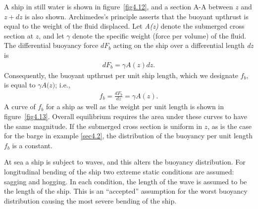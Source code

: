 \documentclass{AeroStructure-ERJohnson}
\begin{document}
A ship in still water is shown in figure~\ref{fig4.12}, and a section A-A between $z$ and $z + \textit{dz}$ is also shown. Archimedes's principle asserts that the buoyant upthrust is equal to the weight of the fluid displaced. Let \textit{A(z)} denote the submerged cross section at $z$, and let $\gamma$ denote the specific weight (force per volume) of the fluid. The differential buoyancy force $dF_{b}$ acting on the ship over a differential length \textit{dz} is
{\def\thefigure{4.12}
}
\vspace*{-2\baselineskip}
\begin{align}\label{eq4.32}
dF_{b}=\gamma A(z) d z.
\end{align}
Consequently, the buoyant upthrust per unit ship length, which we designate $f_{b}$, is equal to $\gamma\textit{A(z)}$; i.e.,
\begin{align}\label{eq4.33}
f_{b}=\frac{d F_{b}}{d z}=\gamma A(z).
\end{align}
\noindent A curve of $f_{b}$ for a ship as well as the weight per unit length is shown in figure~\ref{fig4.13}. Overall equilibrium requires the area under these curves to have the same magnitude. If the submerged cross section is uniform in $z$, as is the case for the barge in example \ref{sec4.2}, the distribution of the buoyancy per unit length $f_{b}$ is a constant.

{\def\thefigure{4.13}
}

At sea a ship is subject to waves, and this alters the buoyancy distribution. For longitudinal bending of the ship two extreme static conditions are assumed: sagging and hogging. In each condition, the length of the wave is assumed to be the length of the ship. This is an ``accepted'' assumption for the worst buoyancy distribution causing the most severe bending of the ship.
\end{document}
